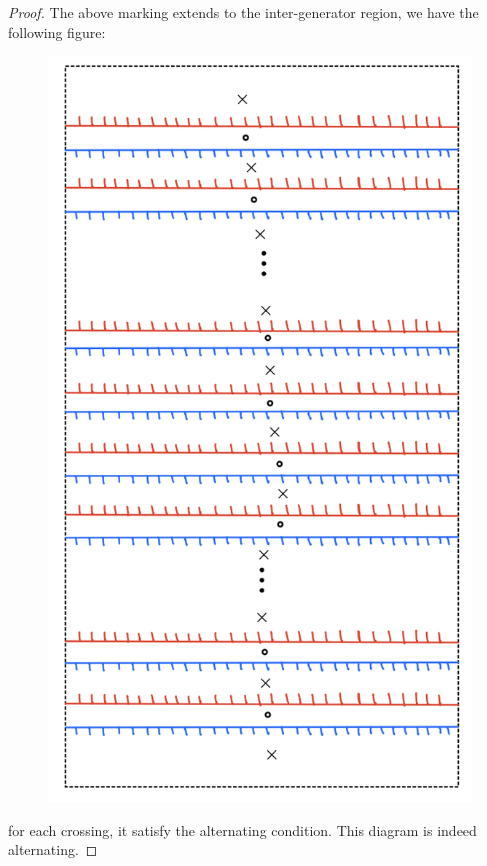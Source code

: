 \begin{proof}
The above marking extends to the inter-generator region, we have the following figure:

\begin{figure}[H] 
    \centering
    \includegraphics[scale = 0.55]{diagrams/natural_alternating_diagrams/12.png}
    \caption{}
    \label{fig:your-label}
\end{figure}

for each crossing, it satisfy the alternating condition. This diagram is indeed alternating.
\end{proof}
\pagebreak